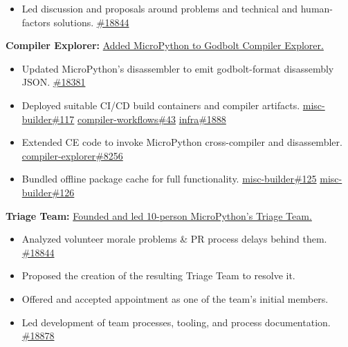 \documentclass[11pt,letterpaper,sans]{./moderncv/moderncv}
\newcommand{\angnote}[1]{%
    {\tiny\textlangle#1\textrangle}%
}
\newcommand{\ghpr}[3]{%
    \angnote{\href{https://github.com/#1/#2/pull/#3}{#2\##3}}%
}
\newcommand{\mppr}[1]{%
    \angnote{\href{https://github.com/micropython/micropython/pull/#1}{\##1}}%
}
\begin{document}
{\begin{itemize}
    \item Led discussion and proposals around problems and technical and human-factors solutions.
        \angnote{\href{https://github.com/orgs/micropython/discussions/18844}{\#18844}}
\end{itemize}
\textbf{Compiler Explorer:} \href{https://python.compiler-explorer.com/z/vveG3o45d}{Added MicroPython to Godbolt Compiler Explorer.}
\begin{itemize}
    \item Updated MicroPython's disassembler to emit godbolt-format disassembly JSON. \mppr{18381}
    \item Deployed suitable CI/CD build containers and compiler artifacts.
        \ghpr{compiler-explorer}{misc-builder}{117} \ghpr{compiler-explorer}{compiler-workflows}{43} \ghpr{compiler-explorer}{infra}{1888}
    \item Extended CE code to invoke MicroPython cross-compiler and disassembler.
        \ghpr{compiler-explorer}{compiler-explorer}{8256}
    \item Bundled offline package cache for full functionality. \ghpr{compiler-explorer}{misc-builder}{125} \ghpr{compiler-explorer}{misc-builder}{126}
\end{itemize}
\textbf{Triage Team:} \href{https://github.com/orgs/micropython/teams/triage-team}{Founded and led 10-person MicroPython's Triage Team.}
\begin{itemize}
    \item Analyzed volunteer morale problems \& PR process delays behind them.
        \angnote{\href{https://github.com/orgs/micropython/discussions/18844}{\#18844}}
    \item Proposed the creation of the resulting Triage Team to resolve it.
    \item Offered and accepted appointment as one of the team's initial members.
    \item Led development of team processes, tooling, and process documentation.
        \angnote{\href{https://github.com/orgs/micropython/discussions/18878}{\#18878}}
\end{itemize}
}
\end{document}
